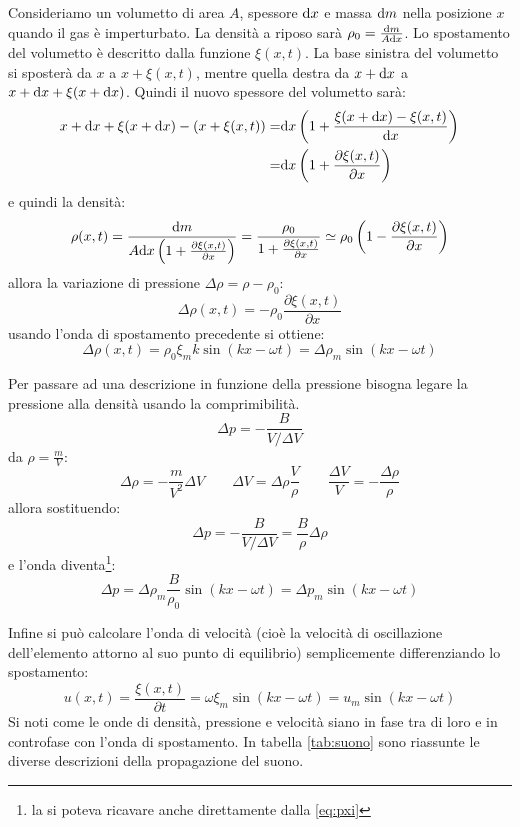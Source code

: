 Consideriamo un volumetto di area $A$, spessore $\mathrm{d} x$ e massa $\mathrm{d} m$ nella posizione $x$ quando il gas è imperturbato. La densità a riposo sarà $\rho_0=\frac{\mathrm{d} m}{A\mathrm{d} x}$. Lo spostamento del volumetto è descritto dalla funzione $\xi(x,t)$. La base sinistra del volumetto si sposterà da $x$ a $x+\xi(x,t)$, mentre quella destra da $x+\mathrm{d} x$ a $x+\mathrm{d} x + \xi(x+\mathrm{d} x)$. Quindi il nuovo spessore del volumetto sarà:
\begin{equation*}
	\begin{aligned}
		x+\mathrm{d} x + \xi(x+\mathrm{d} x) - (x+\xi(x,t)) = & \mathrm{d} x \left(1 + \frac{\xi(x+\mathrm{d} x)-\xi(x,t)}{\mathrm{d} x}\right) \\
		=                                       & \mathrm{d} x\left(1+\frac{\partial \xi(x,t)}{\partial x}\right)
	\end{aligned}
\end{equation*}
e quindi la densità:
\begin{equation}
	\rho(x,t) = \frac{\mathrm{d} m}{A\mathrm{d} x\left(1+\frac{\partial \xi(x,t)}{\partial x}\right)}=\frac{\rho_0}{1+\frac{\partial \xi(x,t)}{\partial x}}\simeq\rho_0\left(1-\frac{\partial \xi(x,t)}{\partial x}\right)
\end{equation}
allora la variazione di pressione $\Delta\rho=\rho-\rho_0$:
\begin{equation}
	\Delta\rho(x,t)=-\rho_0\frac{\partial \xi(x,t)}{\partial x}
\end{equation}
usando l'onda di spostamento precedente si ottiene:
\[
	\Delta\rho(x,t) = \rho_0\xi_m k\sin(kx -\omega t) = \Delta\rho_m\sin(kx -\omega t)
\]

Per passare ad una descrizione in funzione della pressione bisogna legare la pressione alla densità usando la comprimibilità.
\[
	\Delta p = -\frac{B}{V/\Delta V}
\]
da $\rho = \frac{m}{V}$:
\[
	\Delta\rho = -\frac{m}{V^2}\Delta V\qquad \Delta V=\Delta\rho\frac{V}{\rho}\qquad \frac{\Delta V}{V} = -\frac{\Delta\rho}{\rho}
\]
allora sostituendo:
\begin{equation}
	\Delta p = -\frac{B}{V/\Delta V} = \frac{B}{\rho}\Delta\rho
\end{equation}
e l'onda diventa\footnote{la si poteva ricavare anche direttamente dalla \ref{eq:pxi}}:
\begin{equation}
	\Delta p = \Delta \rho_m\frac{B}{\rho_0}\sin(kx -\omega t)=\Delta p_m\sin(kx -\omega t)
\end{equation}

Infine si può calcolare l'onda di velocità (cioè la velocità di oscillazione dell'elemento attorno al suo punto di equilibrio) semplicemente differenziando lo spostamento:
\[
	u(x,t)=\frac{\xi(x,t)}{\partial t} = \omega \xi_m\sin(kx -\omega t)=u_m\sin(kx-\omega t)
\]
Si noti come le onde di densità, pressione e velocità siano in fase tra di loro e in controfase con l'onda di spostamento. In tabella \ref{tab:suono} sono riassunte le diverse descrizioni della propagazione del suono.

